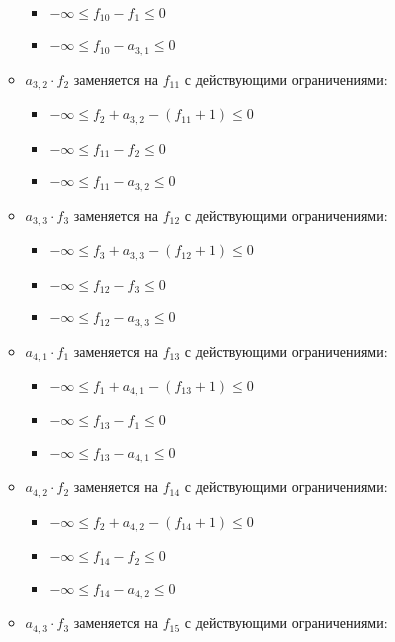 \begin{enumerate}
\begin{itemize}
\begin{itemize}
      \item[] $-\infty \le f_{10} - f_{1} \le 0$ %
      \item[] $-\infty \le f_{10} - a_{3,1} \le 0$ %
    \end{itemize}
    \item $a_{3, 2} \cdot f_{2}$ заменяется на $f_{11}$ с действующими ограничениями:
    \begin{itemize}
      \item[] $-\infty \le f_{2} + a_{3,2} - (f_{11} + 1) \le 0$ %
      \item[] $-\infty \le f_{11} - f_{2} \le 0$ %
      \item[] $-\infty \le f_{11} - a_{3,2} \le 0$ %
    \end{itemize}
    \item $a_{3, 3} \cdot f_{3}$ заменяется на $f_{12}$ с действующими ограничениями:
    \begin{itemize}
      \item[] $-\infty \le f_{3} + a_{3,3} - (f_{12} + 1) \le 0$ %
      \item[] $-\infty \le f_{12} - f_{3} \le 0$ %
      \item[] $-\infty \le f_{12} - a_{3,3} \le 0$ %
    \end{itemize}
    \item $a_{4, 1} \cdot f_{1}$ заменяется на $f_{13}$ с действующими ограничениями:
    \begin{itemize}
      \item[] $-\infty \le f_{1} + a_{4,1} - (f_{13} + 1) \le 0$ %
      \item[] $-\infty \le f_{13} - f_{1} \le 0$ %
      \item[] $-\infty \le f_{13} - a_{4,1} \le 0$ %
    \end{itemize}
    \item $a_{4, 2} \cdot f_{2}$ заменяется на $f_{14}$ с действующими ограничениями:
    \begin{itemize}
      \item[] $-\infty \le f_{2} + a_{4,2} - (f_{14} + 1) \le 0$ %
      \item[] $-\infty \le f_{14} - f_{2} \le 0$ %
      \item[] $-\infty \le f_{14} - a_{4,2} \le 0$ %
    \end{itemize}
    \item $a_{4, 3} \cdot f_{3}$ заменяется на $f_{15}$ с действующими ограничениями:
    \begin{itemize}

\end{itemize}
\end{itemize}
\end{enumerate}
